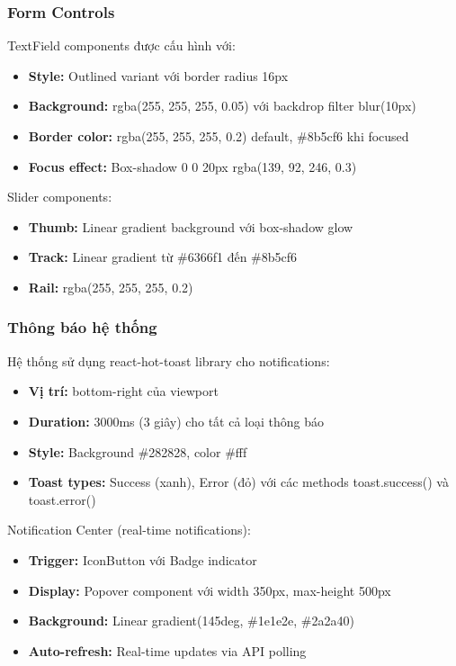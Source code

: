 \subsubsection{Form Controls}

TextField components được cấu hình với:
\begin{itemize}
    \item \textbf{Style:} Outlined variant với border radius 16px
    \item \textbf{Background:} rgba(255, 255, 255, 0.05) với backdrop filter blur(10px)
    \item \textbf{Border color:} rgba(255, 255, 255, 0.2) default, \#8b5cf6 khi focused
    \item \textbf{Focus effect:} Box-shadow 0 0 20px rgba(139, 92, 246, 0.3)
\end{itemize}

Slider components:
\begin{itemize}
    \item \textbf{Thumb:} Linear gradient background với box-shadow glow
    \item \textbf{Track:} Linear gradient từ \#6366f1 đến \#8b5cf6
    \item \textbf{Rail:} rgba(255, 255, 255, 0.2)
\end{itemize}

\subsubsection{Thông báo hệ thống}

Hệ thống sử dụng react-hot-toast library cho notifications:
\begin{itemize}
    \item \textbf{Vị trí:} bottom-right của viewport
    \item \textbf{Duration:} 3000ms (3 giây) cho tất cả loại thông báo
    \item \textbf{Style:} Background \#282828, color \#fff
    \item \textbf{Toast types:} Success (xanh), Error (đỏ) với các methods toast.success() và toast.error()
\end{itemize}

Notification Center (real-time notifications):
\begin{itemize}
    \item \textbf{Trigger:} IconButton với Badge indicator
    \item \textbf{Display:} Popover component với width 350px, max-height 500px
    \item \textbf{Background:} Linear gradient(145deg, \#1e1e2e, \#2a2a40)
    \item \textbf{Auto-refresh:} Real-time updates via API polling
\end{itemize}

